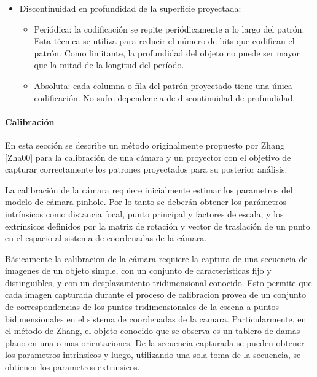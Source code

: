 \begin{itemize}
\begin{itemize}
   \end{itemize}
   \item Discontinuidad en profundidad de la superficie proyectada:
   \begin{itemize}
	\item Periódica: la codificación se repite periódicamente a lo largo del patrón. Esta técnica se utiliza para reducir el número de bits que codifican el patrón. Como limitante, la profundidad del objeto no puede ser mayor que la mitad de la longitud del período.%
	\item Absoluta: cada columna o fila del patrón proyectado tiene una única codificación. No sufre dependencia de discontinuidad de profundidad.
   \end{itemize}
\end{itemize}

\paragraph{Calibración}

En esta sección se describe un método originalmente propuesto por Zhang [Zha00] para la calibración de una cámara y un proyector con el objetivo de capturar correctamente los patrones proyectados para su posterior análisis. 

La calibración de la cámara requiere inicialmente estimar los parametros del modelo de cámara pinhole. Por lo tanto se deberán obtener los parámetros intrínsicos como distancia focal, punto principal y factores de escala, y los extrínsicos definidos por la matriz de rotación y vector de traslación de un punto en el espacio al sistema de coordenadas de la cámara. 

Básicamente la calibracion de la cámara requiere la captura de una secuencia de imagenes de un objeto simple, con un conjunto de caracteristicas fijo y distinguibles, y con un desplazamiento tridimensional conocido. Esto permite que cada imagen capturada durante el proceso de calibracion provea de un conjunto de correspondencias de los puntos tridimensionales de la escena a puntos bidimensionales en el sistema de coordenadas de la camara. Particularmente, en el método de Zhang, el objeto conocido que se observa es un tablero de damas plano en una o mas orientaciones. De la secuencia capturada se pueden obtener los parametros intrinsicos y luego, utilizando una sola toma de la secuencia,  se obtienen los parametros extrinsicos.

